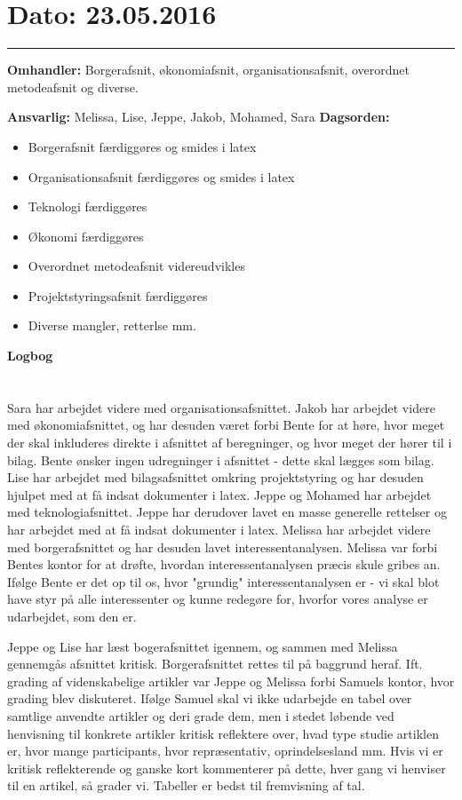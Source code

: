 \section{Dato: 23.05.2016}
\hrule

\textbf{Omhandler:} Borgerafsnit, økonomiafsnit, organisationsafsnit, overordnet metodeafsnit og diverse.

\textbf{Ansvarlig:} Melissa, Lise, Jeppe, Jakob, Mohamed, Sara
\textbf{Dagsorden:}
\begin{itemize}
	\item Borgerafsnit færdiggøres og smides i latex
	\item Organisationsafsnit færdiggøres og smides i latex
	\item Teknologi færdiggøres 
	\item Økonomi færdiggøres 
	\item Overordnet metodeafsnit videreudvikles
	\item Projektstyringsafsnit færdiggøres
	\item Diverse mangler, retterlse mm. 
\end{itemize}

\textbf{Logbog}
\\
\\ \\
Sara har arbejdet videre med organisationsafsnittet. Jakob har arbejdet videre med økonomiafsnittet, og har desuden været forbi Bente for at høre, hvor meget der skal inkluderes direkte i afsnittet af beregninger, og hvor meget der hører til i bilag. Bente ønsker ingen udregninger i afsnittet - dette skal lægges som bilag. 
Lise har arbejdet med bilagsafsnittet omkring projektstyring og har desuden hjulpet med at få indsat dokumenter i latex.
Jeppe og Mohamed har arbejdet med teknologiafsnittet. Jeppe har derudover lavet en masse generelle rettelser og har arbejdet med at få indsat dokumenter i latex.
Melissa har arbejdet videre med borgerafsnittet og har desuden lavet interessentanalysen. Melissa var forbi Bentes kontor for at drøfte, hvordan interessentanalysen præcis skule gribes an. Ifølge Bente er det op til os, hvor "grundig" interessentanalysen er - vi skal blot have styr på alle interessenter og kunne redegøre for, hvorfor vores analyse er udarbejdet, som den er. 

Jeppe og Lise har læst bogerafsnittet igennem, og sammen med Melissa gennemgås afsnittet kritisk. Borgerafsnittet rettes til på baggrund heraf. 
Ift. grading af videnskabelige artikler var Jeppe og Melissa forbi Samuels kontor, hvor grading blev diskuteret. Ifølge Samuel skal vi ikke udarbejde en tabel over samtlige anvendte artikler og deri grade dem, men i stedet løbende ved henvisning til konkrete artikler kritisk reflektere over, hvad type studie artiklen er, hvor mange participants, hvor repræsentativ, oprindelsesland mm. Hvis vi er kritisk reflekterende og ganske kort kommenterer på dette, hver gang vi henviser til en artikel, så grader vi. 
Tabeller er bedst til fremvisning af tal.
